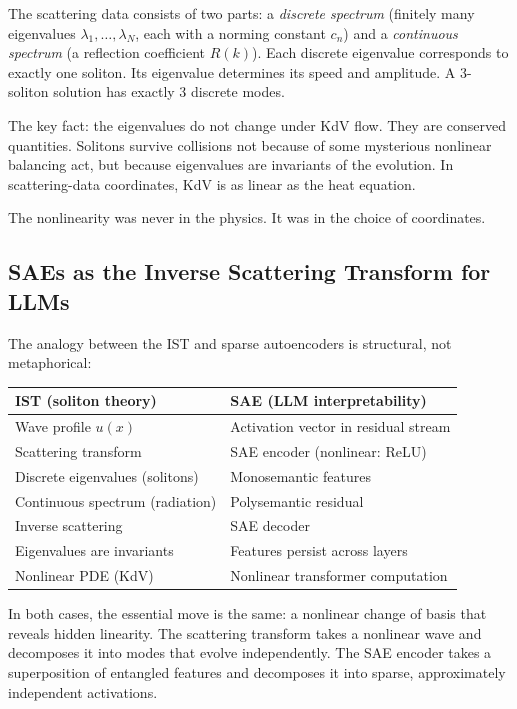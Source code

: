 \documentclass[11pt,a4paper]{article}
\begin{document}
\medskip
The scattering data consists of two parts: a \emph{discrete spectrum} (finitely
many eigenvalues $\lambda_1, \ldots, \lambda_N$, each with a norming constant
$c_n$) and a \emph{continuous spectrum} (a reflection coefficient $R(k)$). Each
discrete eigenvalue corresponds to exactly one soliton. Its eigenvalue determines
its speed and amplitude. A 3-soliton solution has exactly 3 discrete modes.

The key fact: the eigenvalues do not change under KdV flow. They are conserved
quantities. Solitons survive collisions not because of some mysterious nonlinear
balancing act, but because eigenvalues are invariants of the evolution. In
scattering-data coordinates, KdV is as linear as the heat equation.

The nonlinearity was never in the physics. It was in the choice of coordinates.

\subsection{SAEs as the Inverse Scattering Transform for LLMs}

The analogy between the IST and sparse autoencoders is structural, not
metaphorical:

\medskip
\begin{center}
\renewcommand{\arraystretch}{1.3}
\begin{tabular}{@{}ll@{}}
\toprule
\textbf{IST (soliton theory)} & \textbf{SAE (LLM interpretability)} \\
\midrule
Wave profile $u(x)$ & Activation vector in residual stream \\
Scattering transform & SAE encoder (nonlinear: ReLU) \\
Discrete eigenvalues (solitons) & Monosemantic features \\
Continuous spectrum (radiation) & Polysemantic residual \\
Inverse scattering & SAE decoder \\
Eigenvalues are invariants & Features persist across layers \\
Nonlinear PDE (KdV) & Nonlinear transformer computation \\
\bottomrule
\end{tabular}
\end{center}

\medskip
In both cases, the essential move is the same: a nonlinear change of basis that
reveals hidden linearity. The scattering transform takes a nonlinear wave and
decomposes it into modes that evolve independently. The SAE encoder takes a
superposition of entangled features and decomposes it into sparse, approximately
independent activations.
\end{document}
